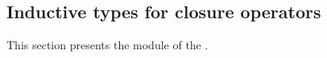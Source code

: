 \documentclass[a4paper,UKenglish,cleveref,autoref,thm-restate]{lipics-v2021}
\begin{document}
\begin{comment}
We will also need to know that the \aof ⊧ relation is compatible with the \AgdaFunction{lift-alg} and \af{lower-alg} operations defined in \S\ref{ssec:the-lift-of-an-algebra}. We omit the easy proofs. \seedocfordetails

An identity is modeled by a class of algebras if and only if it is modeled by all subalgebras of algebras in the class.  One direction is obvious, so we only show here the nontrivial direction; i.e., every term equation \ab p \aof ≈ \ab q that is modeled by \ab 𝒦 is also modeled by every subalgebra of every member of \ab 𝒦.
\ccpad
\begin{code}%

\end{code}

An identity is modeled by a class of algebras if and only if it is modeled by all products of algebras in the class.
\ccpad
\begin{code}%

\end{code}
\ccpad
\ccpad
\begin{code}%

\end{code}
As usual, for the omitted proofs, we refer the reader to the \ualib and its documentation. \seedocfordetails
\end{comment}









\subsection{Inductive types for closure operators}\label{sec:inductive-types-h-s-p-v}
This section presents the \ualibVarietiesVarieties module of the \agdaualib.
\end{document}
